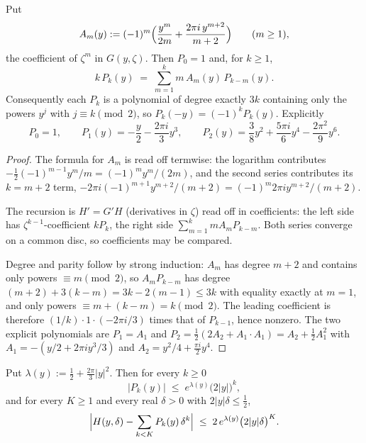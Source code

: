 \begin{lemma}
\label{lem:rsg_recursion}
Put
\[
  A_{m}(y):=(-1)^{m}\Bigl(\frac{y^{m}}{2m}+\frac{2\pi i\,y^{m+2}}{m+2}\Bigr)\qquad(m\ge1),
\]
the coefficient of $\zeta^{m}$ in $G(y,\zeta)$.  Then $P_{0}=1$ and, for $k\ge1$,
\[
  k\,P_{k}(y)\;=\;\sum_{m=1}^{k}m\,A_{m}(y)\,P_{k-m}(y).
\]
Consequently each $P_{k}$ is a polynomial of degree exactly $3k$ containing only the powers
$y^{j}$ with $j\equiv k\pmod 2$, so $P_{k}(-y)=(-1)^{k}P_{k}(y)$.  Explicitly
\[
  P_{0}=1,\qquad P_{1}(y)=-\frac y2-\frac{2\pi i}{3}y^{3},\qquad
  P_{2}(y)=\frac38y^{2}+\frac{5\pi i}{6}y^{4}-\frac{2\pi^{2}}{9}y^{6}.
\]
\end{lemma}

\begin{proof}
The formula for $A_{m}$ is  read off termwise: the logarithm contributes
$-\tfrac12(-1)^{m-1}y^{m}/m=(-1)^{m}y^{m}/(2m)$, and the second series contributes its $k=m+2$
term, $-2\pi i(-1)^{m+1}y^{m+2}/(m+2)=(-1)^{m}2\pi iy^{m+2}/(m+2)$.

The recursion is $H'=G'H$ (derivatives in $\zeta$) read off in coefficients: the left side has
$\zeta^{k-1}$-coefficient $kP_{k}$, the right side $\sum_{m=1}^{k}mA_{m}P_{k-m}$.  Both series
converge on a common disc, so coefficients may be compared.

Degree and parity follow by strong induction: $A_{m}$ has degree $m+2$ and contains only powers
$\equiv m\pmod2$, so $A_{m}P_{k-m}$ has degree $(m+2)+3(k-m)=3k-2(m-1)\le3k$ with equality
exactly at $m=1$, and only powers $\equiv m+(k-m)=k\pmod 2$.  The leading coefficient is
therefore $(1/k)\cdot1\cdot(-2\pi i/3)$ times that of $P_{k-1}$, hence nonzero.  The two explicit
polynomials are $P_{1}=A_{1}$ and $P_{2}=\tfrac12(2A_{2}+A_{1}\cdot A_{1})=A_{2}+\tfrac12A_{1}^{2}$
with $A_{1}=-(y/2+2\pi iy^{3}/3)$ and $A_{2}=y^{2}/4+\tfrac{\pi i}2y^{4}$.
\end{proof}

\begin{lemma}
\label{lem:rsg_cauchy}
Put $\lambda(y):=\tfrac12+\tfrac{2\pi}3\lvert y\rvert^{2}$.  Then for every $k\ge0$
\[
  \lvert P_{k}(y)\rvert\;\le\;e^{\lambda(y)}\bigl(2\lvert y\rvert\bigr)^{k},
\]
and for every $K\ge1$ and every real $\delta>0$ with $2\lvert y\rvert\delta\le\tfrac12$,
\[
  \Bigl\lvert H(y,\delta)-\sum_{k<K}P_{k}(y)\,\delta^{k}\Bigr\rvert
  \;\le\;2\,e^{\lambda(y)}\bigl(2\lvert y\rvert\delta\bigr)^{K}.
\]
\end{lemma}

